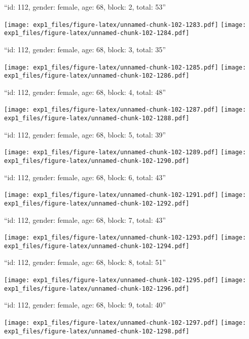 \documentclass[11pt,,]{article}
\begin{document}
\newpage
[1] 

``id: 112, gender: female, age: 68, block: 2, total: 53''

\texttt{[image: exp1\_files/figure-latex/unnamed-chunk-102-1283.pdf]}
\texttt{[image: exp1\_files/figure-latex/unnamed-chunk-102-1284.pdf]}

\newpage
[1] 

``id: 112, gender: female, age: 68, block: 3, total: 35''

\texttt{[image: exp1\_files/figure-latex/unnamed-chunk-102-1285.pdf]}
\texttt{[image: exp1\_files/figure-latex/unnamed-chunk-102-1286.pdf]}

\newpage
[1] 

``id: 112, gender: female, age: 68, block: 4, total: 48''

\texttt{[image: exp1\_files/figure-latex/unnamed-chunk-102-1287.pdf]}
\texttt{[image: exp1\_files/figure-latex/unnamed-chunk-102-1288.pdf]}

\newpage
[1] 

``id: 112, gender: female, age: 68, block: 5, total: 39''

\texttt{[image: exp1\_files/figure-latex/unnamed-chunk-102-1289.pdf]}
\texttt{[image: exp1\_files/figure-latex/unnamed-chunk-102-1290.pdf]}

\newpage
[1] 

``id: 112, gender: female, age: 68, block: 6, total: 43''

\texttt{[image: exp1\_files/figure-latex/unnamed-chunk-102-1291.pdf]}
\texttt{[image: exp1\_files/figure-latex/unnamed-chunk-102-1292.pdf]}

\newpage
[1] 

``id: 112, gender: female, age: 68, block: 7, total: 43''

\texttt{[image: exp1\_files/figure-latex/unnamed-chunk-102-1293.pdf]}
\texttt{[image: exp1\_files/figure-latex/unnamed-chunk-102-1294.pdf]}

\newpage
[1] 

``id: 112, gender: female, age: 68, block: 8, total: 51''

\texttt{[image: exp1\_files/figure-latex/unnamed-chunk-102-1295.pdf]}
\texttt{[image: exp1\_files/figure-latex/unnamed-chunk-102-1296.pdf]}

\newpage
[1] 

``id: 112, gender: female, age: 68, block: 9, total: 40''

\texttt{[image: exp1\_files/figure-latex/unnamed-chunk-102-1297.pdf]}
\texttt{[image: exp1\_files/figure-latex/unnamed-chunk-102-1298.pdf]}
\end{document}
